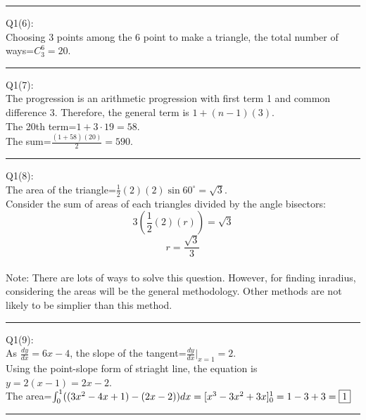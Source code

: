 \documentclass{article}
\begin{document}
\vspace{1cm}
\hrule
\vspace{1cm}

\noindent Q1(6):\\
Choosing 3 points among the 6 point to make a triangle, the total number of ways=$C_3^6=\boxed{20}$.

\vspace{1cm}
\hrule
\vspace{1cm}

\noindent Q1(7):\\
The progression is an arithmetic progression with first term 1 and common difference $3$. Therefore, the general term is $1+(n-1)(3)$.\\
The 20th term=$1+3\cdot19=\boxed{58}$.\\
The sum=$\frac{(1+58)(20)}{2}=\boxed{590}$.

\vspace{1cm}
\hrule
\vspace{1cm}

\noindent Q1(8):\\
The area of the triangle=$\frac{1}{2}(2)(2)\sin60^\circ=\sqrt3$.\\
Consider the sum of areas of each triangles divided by the angle bisectors:
$$3(\frac{1}{2}(2)(r))=\sqrt3$$
$$r=\boxed{\frac{\sqrt3}{3}}$$
\\
Note: There are lots of ways to solve this question. However, for finding inradius, considering the areas will be the general methodology. Other methods are not likely to be simplier than this method.

\vspace{1cm}
\hrule
\vspace{1cm}

\noindent Q1(9):\\
As $\frac{dy}{dx}=6x-4$, the slope of the tangent=$\frac{dy}{dx}|_{x=1}=2$.\\
Using the point-slope form of striaght line, the equation is $y=2(x-1)=\boxed{2x-2}$.\\
The area=$\int_0^1((3x^2-4x+1)-(2x-2))dx\\
=[x^3-3x^2+3x]_0^1\\
=1-3+3\\
=\boxed1$

\vspace{1cm}
\hrule
\vspace{1cm}
\end{document}
